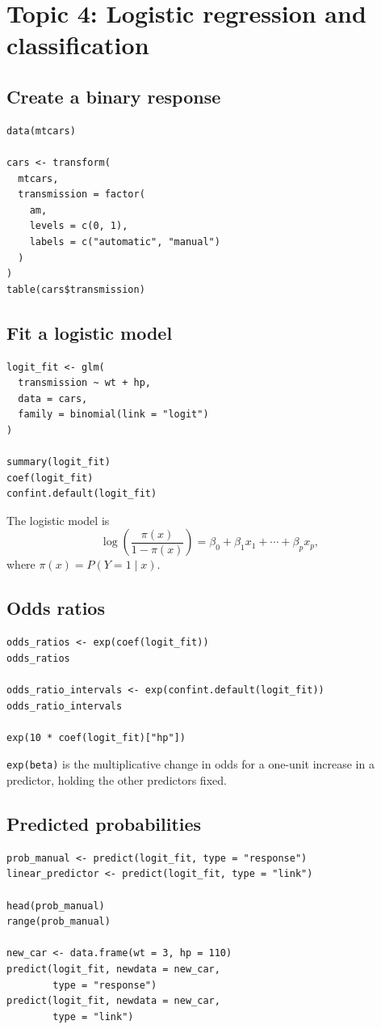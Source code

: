 \documentclass[11pt]{article}
\begin{document}
\section{Topic 4: Logistic regression and classification}

\subsection{Create a binary response}
\begin{lstlisting}
data(mtcars)

cars <- transform(
  mtcars,
  transmission = factor(
    am,
    levels = c(0, 1),
    labels = c("automatic", "manual")
  )
)
table(cars$transmission)
\end{lstlisting}

\subsection{Fit a logistic model}
\begin{lstlisting}
logit_fit <- glm(
  transmission ~ wt + hp,
  data = cars,
  family = binomial(link = "logit")
)

summary(logit_fit)
coef(logit_fit)
confint.default(logit_fit)
\end{lstlisting}

The logistic model is
\[
 \log\left(\frac{\pi(x)}{1-\pi(x)}\right)
 =\beta_0+\beta_1x_1+\cdots+\beta_px_p,
\]
where $\pi(x)=P(Y=1\mid x)$.

\subsection{Odds ratios}
\begin{lstlisting}
odds_ratios <- exp(coef(logit_fit))
odds_ratios

odds_ratio_intervals <- exp(confint.default(logit_fit))
odds_ratio_intervals

exp(10 * coef(logit_fit)["hp"])
\end{lstlisting}

\texttt{exp(beta)} is the multiplicative change in odds for a one-unit
increase in a predictor, holding the other predictors fixed.

\subsection{Predicted probabilities}
\begin{lstlisting}
prob_manual <- predict(logit_fit, type = "response")
linear_predictor <- predict(logit_fit, type = "link")

head(prob_manual)
range(prob_manual)

new_car <- data.frame(wt = 3, hp = 110)
predict(logit_fit, newdata = new_car,
        type = "response")
predict(logit_fit, newdata = new_car,
        type = "link")
\end{lstlisting}
\end{document}
